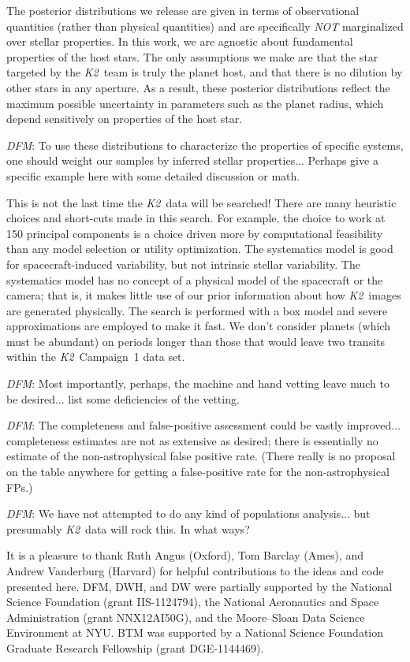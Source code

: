 \documentclass[12pt,preprint]{aastex}
\newcommand{\project}[1]{\textsl{#1}} %
\newcommand{\KT}{\project{K2}}
\newcommand{\todo}[3]{{\color{#2}\emph{#1}: #3}}
\newcommand{\dfmtodo}[1]{\todo{DFM}{red}{#1}}
\begin{document}
The posterior distributions we release are given in terms of observational
quantities (rather than physical quantities) and are specifically \emph{NOT}
marginalized over stellar properties.
In this work, we are agnostic about fundamental properties of the host stars.
The only assumptions we make are that the star targeted by the \KT\
team is truly the planet host, and that there is no dilution by other stars in
any aperture.
As a result, these posterior distributions reflect the maximum possible
uncertainty in parameters such as the planet radius, which depend sensitively
on properties of the host star.

\dfmtodo{
To use these distributions to characterize the properties of specific systems,
one should weight our samples by inferred stellar properties...
Perhaps give a specific example here with some detailed discussion or math.
}

This is not the last time the \KT\ data will be searched!
There are many heuristic choices and short-cuts made in this search.
For example, the choice to work at 150 principal components is a choice
driven more by computational feasibility than any model selection or
utility optimization.
The systematics model is good for spacecraft-induced variability, but not
intrinsic stellar variability.
The systematics model has no concept of a physical model of the spacecraft or
the camera; that is, it makes little use of our prior information about how
\KT\ images are generated physically.
The search is performed with a box model and severe approximations are employed
to make it fast.
We don't consider planets (which must be abundant) on periods longer
than those that would leave two transits within the \KT\ Campaign~1
data set.

\dfmtodo{
Most importantly, perhaps, the machine and hand vetting leave much to be desired...
list some deficiencies of the vetting.
}

\dfmtodo{
The completeness and false-positive assessment could be vastly improved...
completeness estimates are not as extensive as desired;
there is essentially no estimate of the non-astrophysical false positive rate.
(There really is no proposal on the table anywhere for getting a false-positive
rate for the non-astrophysical FPs.)
}

\dfmtodo{
We have not attempted to do any kind of populations analysis...
but presumably \KT\ data will rock this.  In what ways?
}

\acknowledgments
It is a pleasure to thank
Ruth Angus (Oxford),
Tom Barclay (Ames), and
Andrew Vanderburg (Harvard)
for helpful contributions to the ideas and code presented here.
DFM, DWH, and DW were partially supported by the National Science Foundation
(grant IIS-1124794),
the National Aeronautics and Space Administration
(grant NNX12AI50G), and the Moore--Sloan Data Science Environment at NYU.
BTM was supported by a National Science Foundation Graduate Research
Fellowship (grant DGE‐1144469).
\end{document}
